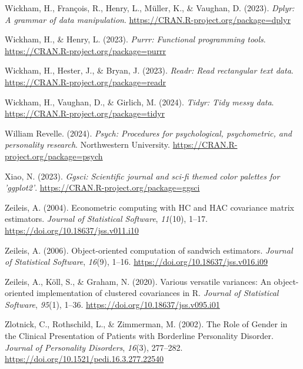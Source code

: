 \documentclass[
  man,floatsintext]{apa7}
\newlength{\cslhangindent}
\newlength{\cslentryspacingunit} %
\newenvironment{CSLReferences}[2] %
 {%
  \setlength{\parindent}{0pt}
  \ifodd #1
  \let\oldpar\par
  \def\par{\hangindent=\cslhangindent\oldpar}
  \fi
  \setlength{\parskip}{#2\cslentryspacingunit}
 }%
 {}
\begin{document}
\begin{CSLReferences}{1}{0}
\leavevmode{}%
Wickham, H., François, R., Henry, L., Müller, K., \& Vaughan, D. (2023). \emph{Dplyr: A grammar of data manipulation}. \url{https://CRAN.R-project.org/package=dplyr}

\leavevmode{}%
Wickham, H., \& Henry, L. (2023). \emph{Purrr: Functional programming tools}. \url{https://CRAN.R-project.org/package=purrr}

\leavevmode{}%
Wickham, H., Hester, J., \& Bryan, J. (2023). \emph{Readr: Read rectangular text data}. \url{https://CRAN.R-project.org/package=readr}

\leavevmode{}%
Wickham, H., Vaughan, D., \& Girlich, M. (2024). \emph{Tidyr: Tidy messy data}. \url{https://CRAN.R-project.org/package=tidyr}

\leavevmode{}%
William Revelle. (2024). \emph{Psych: Procedures for psychological, psychometric, and personality research}. Northwestern University. \url{https://CRAN.R-project.org/package=psych}

\leavevmode{}%
Xiao, N. (2023). \emph{Ggsci: Scientific journal and sci-fi themed color palettes for 'ggplot2'}. \url{https://CRAN.R-project.org/package=ggsci}

\leavevmode{}%
Zeileis, A. (2004). Econometric computing with {HC} and {HAC} covariance matrix estimators. \emph{Journal of Statistical Software}, \emph{11}(10), 1--17. \url{https://doi.org/10.18637/jss.v011.i10}

\leavevmode{}%
Zeileis, A. (2006). Object-oriented computation of sandwich estimators. \emph{Journal of Statistical Software}, \emph{16}(9), 1--16. \url{https://doi.org/10.18637/jss.v016.i09}

\leavevmode{}%
Zeileis, A., Köll, S., \& Graham, N. (2020). Various versatile variances: An object-oriented implementation of clustered covariances in {R}. \emph{Journal of Statistical Software}, \emph{95}(1), 1--36. \url{https://doi.org/10.18637/jss.v095.i01}

\leavevmode{}%
Zlotnick, C., Rothschild, L., \& Zimmerman, M. (2002). The {Role} of {Gender} in the {Clinical Presentation} of {Patients} with {Borderline Personality Disorder}. \emph{Journal of Personality Disorders}, \emph{16}(3), 277--282. \url{https://doi.org/10.1521/pedi.16.3.277.22540}

\end{CSLReferences}
\end{document}
